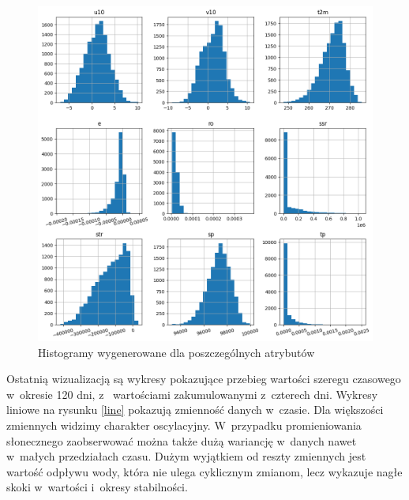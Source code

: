 \begin{figure}[H]
    \centering
    \includegraphics[width=\textwidth]{images/hist.png}
    \caption[Histogramy]{Histogramy wygenerowane dla poszczególnych atrybutów}
    \label{hist}
\end{figure}

Ostatnią wizualizacją są wykresy pokazujące przebieg wartości szeregu czasowego w~okresie 120 dni, z~
wartościami zakumulowanymi z~czterech dni. Wykresy liniowe na rysunku \ref{line} pokazują zmienność
danych w~czasie. Dla większości zmiennych widzimy charakter oscylacyjny. W~przypadku promieniowania 
słonecznego zaobserwować można także dużą wariancję w~danych nawet w~małych przedziałach czasu. 
Dużym wyjątkiem od reszty zmiennych jest wartość odpływu wody, która nie ulega cyklicznym zmianom, lecz
wykazuje nagłe skoki w~wartości i~okresy stabilności.

